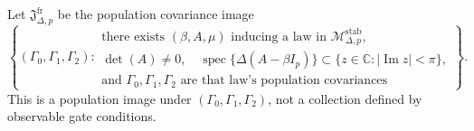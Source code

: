 Let \(\mathfrak J_{\Delta,p}^{\mathrm{fr}}\) be the population covariance image
\[
 \left\{(\Gamma_0,\Gamma_1,\Gamma_2):\begin{array}{l}
 \text{there exists }(\beta,A,\mu)\text{ inducing a law in }\mathcal M_{\Delta,p}^{\mathrm{stab}},\\
 \det(A)\neq0,\quad
 \operatorname{spec}\{\Delta(A-\beta I_p)\}
 \subset\{z\in\mathbb C:|\operatorname{Im}z|<\pi\},\\
 \text{and }\Gamma_0,\Gamma_1,\Gamma_2\text{ are that law's population covariances}
 \end{array}\right\}.
\]
This is a population image under \((\Gamma_0,\Gamma_1,\Gamma_2)\), not a collection defined by observable gate conditions.